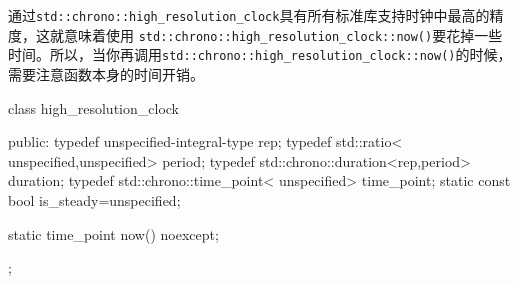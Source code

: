 通过\texttt{std::chrono::high\_resolution\_clock}具有所有标准库支持时钟中最高的精度，这就意味着使用
\texttt{std::chrono::high\_resolution\_clock::now()}要花掉一些时间。所以，当你再调用\texttt{std::chrono::high\_resolution\_clock::now()}的时候，需要注意函数本身的时间开销。


\begin{cpp}
class high_resolution_clock
{
public:
  typedef unspecified-integral-type rep;
  typedef std::ratio<
      unspecified,unspecified> period;
  typedef std::chrono::duration<rep,period> duration;
  typedef std::chrono::time_point<
      unspecified> time_point;
  static const bool is_steady=unspecified;

  static time_point now() noexcept;
};
\end{cpp}